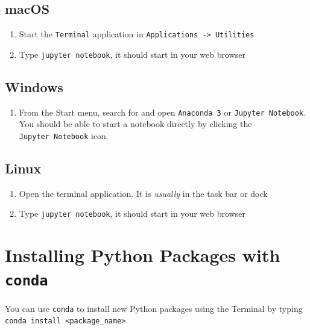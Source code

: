 \documentclass[
]{book}
\providecommand{\tightlist}{%
  \setlength{\itemsep}{0pt}\setlength{\parskip}{0pt}}
\begin{document}
\hypertarget{macos}{%
\subsection{macOS}\label{macos}}

\begin{enumerate}
\def\labelenumi{\arabic{enumi}.}
\tightlist
\item
  Start the \texttt{Terminal} application in \texttt{Applications\ -\textgreater{}\ Utilities}
\item
  Type \texttt{jupyter\ notebook}, it should start in your web browser
\end{enumerate}

\hypertarget{windows}{%
\subsection{Windows}\label{windows}}

\begin{enumerate}
\def\labelenumi{\arabic{enumi}.}
\tightlist
\item
  From the Start menu, search for and open \texttt{Anaconda\ 3} or \texttt{Jupyter\ Notebook}. You should be able to start a notebook directly by clicking the \texttt{Jupyter\ Notebook} icon.
\end{enumerate}

\hypertarget{linux}{%
\subsection{Linux}\label{linux}}

\begin{enumerate}
\def\labelenumi{\arabic{enumi}.}
\tightlist
\item
  Open the terminal application. It is \emph{usually} in the task bar or dock
\item
  Type \texttt{jupyter\ notebook}, it should start in your web browser
\end{enumerate}

\hypertarget{installing-python-packages-with-conda}{%
\section{\texorpdfstring{Installing Python Packages with \texttt{conda}}{Installing Python Packages with conda}}\label{installing-python-packages-with-conda}}

You can use \texttt{conda} to install new Python packages using the Terminal by typing \texttt{conda\ install\ \textless{}package\_name\textgreater{}}.
\end{document}
